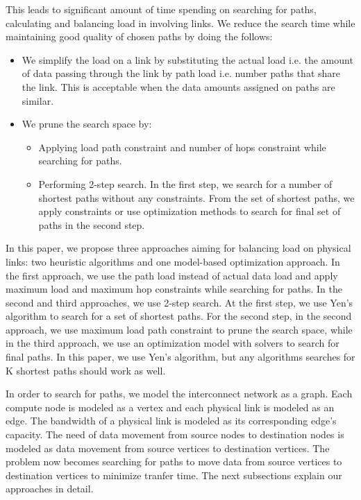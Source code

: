 This leads to significant amount of time spending on searching for paths, calculating and balancing load in involving links. We reduce the search time while maintaining good quality of chosen paths by doing the follows:
\begin{itemize}
\item We simplify the load on a link by substituting the actual load i.e. the amount of data passing through the link by path load i.e. number paths that share the link. This is acceptable when the data amounts assigned on paths are similar.
\item We prune the search space by:
\begin{itemize}
\item Applying load path constraint and number of hops constraint while searching for paths.
\item Performing 2-step search. In the first step, we search for a number of shortest paths without any constraints. From the set of shortest paths, we apply constraints or use optimization methods to search for final set of paths in the second step.
\end{itemize}
\end{itemize}

In this paper, we propose three approaches aiming for balancing load on physical links: two heuristic algorithms and one model-based optimization approach. In the first approach, we use the path load instead of actual data load and apply maximum load and maximum hop constraints while searching for paths. In the second and third approaches, we use 2-step search. At the first step, we use Yen's algorithm \cite{Yen:Kpath} to search for a set of shortest paths. For the second step, in the second approach, we use maximum load path constraint to prune the search space, while in the third approach, we use an optimization model with solvers to search for final paths. In this paper, we use Yen's algorithm, but any algorithms searches for K shortest paths should work as well.

In order to search for paths, we model the interconnect network as a graph. Each compute node is modeled as a vertex and each physical link is modeled as an edge. The bandwidth of a physical link is modeled as its corresponding edge's capacity. The need of data movement from source nodes to destination nodes is modeled as data movement from source vertices to destination vertices. The problem now becomes searching for paths to move data from source vertices to destination vertices to minimize tranfer time. The next subsections explain our approaches in detail.

